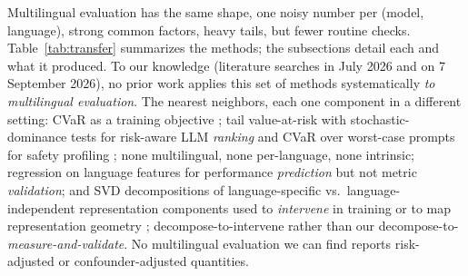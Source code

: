 \documentclass[11pt,a4paper]{article}
\begin{document}
Multilingual evaluation has the same shape, one noisy
number per (model, language), strong common factors, heavy tails, but
fewer routine checks. Table~\ref{tab:transfer}
summarizes the methods; the subsections detail each and what it
produced. To our knowledge (literature searches in July 2026 and on 7 September
2026), no prior work applies this set of methods systematically \emph{to
multilingual evaluation}. The nearest neighbors, each one component in a
different setting: CVaR as a training objective \citep{oren2019dro}; tail
value-at-risk with stochastic-dominance tests for risk-aware LLM
\emph{ranking} \citep{nitsure2024risk} and CVaR over worst-case prompts for
safety profiling \citep{sharp2026}; none multilingual, none per-language,
none intrinsic; regression on language features for performance
\emph{prediction} \citep{lin2019langrank,xia2020nlperf} but not metric
\emph{validation}; and SVD decompositions of language-specific vs.\
language-independent representation components used to \emph{intervene} in
training \citep{zhao2025decompose} or to map representation geometry
\citep{chang2022geometry}; decompose-to-intervene rather than our
decompose-to-\emph{measure-and-validate}. No multilingual evaluation we can
find reports risk-adjusted or confounder-adjusted quantities.
\end{document}
